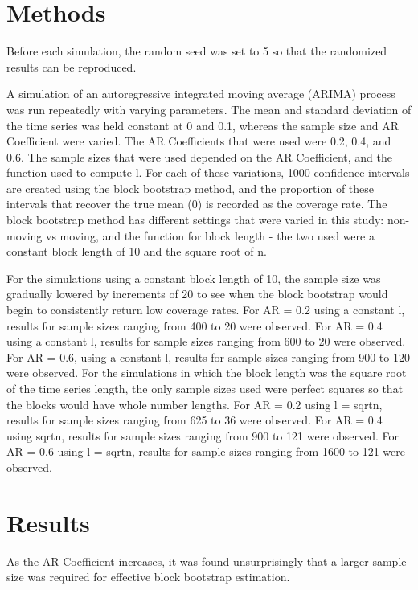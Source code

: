 \documentclass[12pt, letterpaper, titlepage]{article}
\begin{document}
\section{Methods}
\label{sec:methods}

Before each simulation, the random seed was set to 5 so that the randomized results can be 
reproduced. 

A simulation of an autoregressive integrated moving average (ARIMA) process was run 
repeatedly with varying parameters. 
The mean and standard deviation of the time series was held constant at 0 and 0.1, whereas 
the sample size and AR Coefficient
 were varied. The AR Coefficients that were used were 0.2, 0.4, and 0.6. The sample sizes 
 that were used depended on the AR
 Coefficient, and the function used to compute l. For each of these variations, 1000 
 confidence intervals are created using
 the block bootstrap method, and the proportion of these intervals that recover the true 
 mean (0) is recorded as the coverage
 rate. The block bootstrap method has different settings that were varied in this study: 
 non-moving vs moving, 
and the function for block length - the two used were a constant block length of 10 and 
the square root of n.

For the simulations using a constant block length of 10, the sample size was gradually 
lowered by increments of 20 to see when
the block bootstrap would begin to consistently return low coverage rates. For AR = 0.2 
using a constant l, results for
sample sizes ranging from 400 to 20 were observed. For AR = 0.4 using a constant l, 
results for sample sizes ranging from 600
to 20 were observed. For AR = 0.6, using a constant l, results for sample sizes ranging 
from 900 to 120 were observed. For the simulations in which the block length was the 
square root of the time series length, the only sample sizes used were perfect squares so 
that the blocks would have whole number lengths. For AR = 0.2 using l = sqrt{n}, results 
for sample sizes ranging from 625 to 36 were observed. For AR = 0.4 using sqrt{n}, results 
for sample sizes ranging from 900 to 121 were observed. For AR = 0.6 using l = sqrt{n}, 
results for sample sizes ranging from 1600 to 121 were observed. 

\section{Results}
\label{sec:results}

As the AR Coefficient increases, it was found unsurprisingly that a larger sample size was 
required for effective block bootstrap estimation. 
\end{document}
